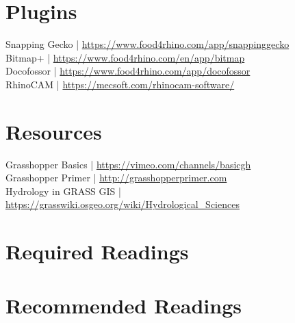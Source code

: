 \documentclass[11pt,article,oneside]{memoir}
\begin{document}
\section{Plugins}
Snapping Gecko | \url{https://www.food4rhino.com/app/snappinggecko}\\
Bitmap+ | \url{https://www.food4rhino.com/en/app/bitmap}\\
Docofossor | \url{https://www.food4rhino.com/app/docofossor}\\
RhinoCAM | \url{https://mecsoft.com/rhinocam-software/}\\

\section{Resources}

Grasshopper Basics | \url{https://vimeo.com/channels/basicgh}\\
Grasshopper Primer | \url{http://grasshopperprimer.com}\\
Hydrology in GRASS GIS | \url{https://grasswiki.osgeo.org/wiki/Hydrological_Sciences}\\

\section{Required Readings}
\vspace*{0.5cm}
\nocite{*}
\setlength{}
\printbibliography[keyword=required, heading=none]

\section{Recommended Readings}
\vspace*{0.5cm}
\nocite{*}
\setlength{}
\printbibliography[keyword=recommended, heading=none]
\end{document}
